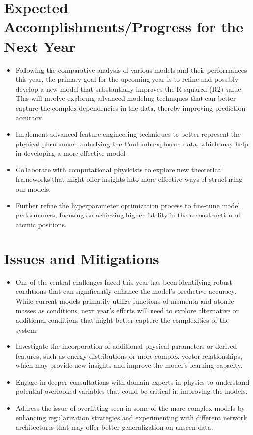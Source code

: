 \documentclass{article}
\begin{document}
\section*{Expected Accomplishments/Progress for the Next Year}
\begin{itemize}
    \item Following the comparative analysis of various models and their performances this year, the primary goal for the upcoming year is to refine and possibly develop a new model that substantially improves the R-squared (R2) value. This will involve exploring advanced modeling techniques that can better capture the complex dependencies in the data, thereby improving prediction accuracy.
    \item Implement advanced feature engineering techniques to better represent the physical phenomena underlying the Coulomb explosion data, which may help in developing a more effective model.
    \item Collaborate with computational physicists to explore new theoretical frameworks that might offer insights into more effective ways of structuring our models.
    \item Further refine the hyperparameter optimization process to fine-tune model performances, focusing on achieving higher fidelity in the reconstruction of atomic positions.
\end{itemize}


\section*{Issues and Mitigations}
\begin{itemize}
    \item One of the central challenges faced this year has been identifying robust conditions that can significantly enhance the model's predictive accuracy. While current models primarily utilize functions of momenta and atomic masses as conditions, next year's efforts will need to explore alternative or additional conditions that might better capture the complexities of the system.
    \item Investigate the incorporation of additional physical parameters or derived features, such as energy distributions or more complex vector relationships, which may provide new insights and improve the model's learning capacity.
    \item Engage in deeper consultations with domain experts in physics to understand potential overlooked variables that could be critical in improving the models.
    \item Address the issue of overfitting seen in some of the more complex models by enhancing regularization strategies and experimenting with different network architectures that may offer better generalization on unseen data.
\end{itemize}
\end{document}
